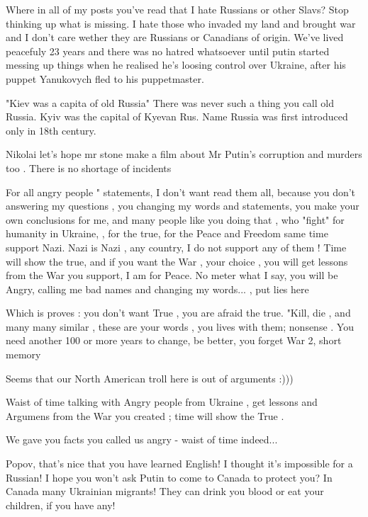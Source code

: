 \begin{itemize}
\begin{itemize}
Where in all of my posts you've read that I hate Russians or other Slavs? Stop
thinking up what is missing. I hate those who invaded my land and brought war
and I don't care wether they are Russians or Canadians of origin. We've lived
peacefuly 23 years and there was no hatred whatsoever until putin started
messing up things when he realised he's loosing control over Ukraine, after his
puppet Yanukovych fled to his puppetmaster.

"Kiev was a capita of old Russia" There was never such a thing you call old
Russia. Kyiv was the capital of Kyevan Rus. Name Russia was first introduced
only in 18th century.


Nikolai let's hope mr stone make a film about Mr Putin's corruption and murders
too . There is no shortage of incidents


For all angry people " statements, I don't want read them all, because you
don't answering my questions , you changing my words and statements, you make
your own conclusions for me, and many people like you doing that , who "fight"
for humanity in Ukraine, , for the true, for the Peace and Freedom same time
support Nazi. Nazi is Nazi , any country, I do not support any of them ! Time
will show the true, and if you want the War , your choice , you will get
lessons from the War you support, I am for Peace. No meter what I say, you will
be Angry, calling me bad names and changing my words... , put lies here

Which is proves : you don't want True , you are afraid the true. "Kill, die ,
and many many similar , these are your words , you lives with them; nonsense .
You need another 100 or more years to change, be better, you forget War 2,
short memory


Seems that our North American troll here is out of arguments :)))

Waist of time talking with Angry people from Ukraine , get lessons and Argumens from the War you created ; time will show the True .

We gave you facts you called us angry - waist of time indeed...


Popov, that's nice that you have learned English! I thought it's impossible for
a Russian! I hope you won't ask Putin to come to Canada to protect you? In
Canada many Ukrainian migrants! They can drink you blood or eat your children,
if you have any!


\end{itemize}
\end{itemize}
